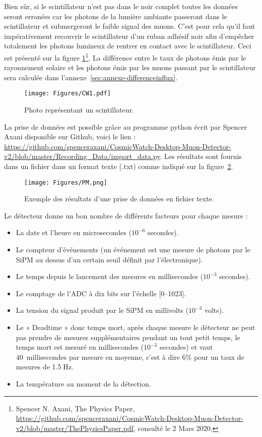 \documentclass[a4paper, 12pt]{article}
\begin{document}
\begin{spacing}{1.5}
Bien sûr, si le scintillateur n'est pas dans le noir complet toutes les données seront erronées car les photons de la lumière ambiante passeront dans le scintillateur et submergeront le faible signal des muons. C’est pour cela qu’il faut impérativement recouvrir le scintillateur d'un ruban adhésif noir afin d'empêcher totalement les photons lumineux de rentrer en contact avec le scintillateur. Ceci est présenté sur la figure \ref{fig:noir}\footnote{Spencer N. Axani, The Physics Paper, \url{https://github.com/spenceraxani/CosmicWatch-Desktop-Muon-Detector-v2/blob/master/ThePhysicsPaper.pdf}, consulté le 2 Mars 2020.}. La différence entre le taux de photons émis par le rayonnement solaire et les photons émis par les muons passant par le scintillateur sera calculée dans l'annexe~\ref{sec:annexe-differenceinflux}. 

\begin{figure}[t]
\begin{center}
\texttt{[image: Figures/CW1.pdf]}
\caption{\label{fig:noir} Photo représentant un scintillateur.}
\end{center}
\end{figure}

La prise de données est possible grâce au programme python écrit par Spencer Axani disponible sur Github, voici le lien : \url{https://github.com/spenceraxani/CosmicWatch-Desktop-Muon-Detector-v2/blob/master/Recording_Data/import_data.py}. Les résultats sont fournis dans un fichier dans un format texte (.txt) comme indiqué sur la figure~\ref{fig:ex.mesurement}.

\begin{figure}[t]
\begin{center}
\texttt{[image: Figures/PM.png]}
\caption{\label{fig:ex.mesurement} Exemple des résultats d'une prise de données en fichier texte.}
\end{center}
\end{figure}

Le détecteur donne un bon nombre de différents facteurs pour chaque mesure :
\begin{itemize}
  \item La date et l'heure en microsecondes ($10^{-6}$ secondes).
  \item Le compteur d'événements (un événement est une mesure de photons par le SiPM au dessus d'un certain seuil définit par l'électronique).
  \item Le temps depuis le lancement des mesures en millisecondes ($10^{-3}$ secondes).
  \item Le comptage de l'ADC à dix bits sur l’échelle [0--1023].
  \item La tension du signal produit par le SiPM en millivolts ($10^{-3}$ volts).
  \item Le « Deadtime » donc temps mort, après chaque mesure le détecteur ne peut pas prendre de mesures supplémentaires pendant un tout petit temps, le temps mort est mesuré en millisecondes ($10^{-3}$ secondes) et vaut 40~millisecondes par mesure en moyenne, c'est à dire 6\% pour un taux de mesures de 1.5$\;$Hz.
  \item La température au moment de la détection.
\end{itemize}



\end{spacing}
\end{document}
